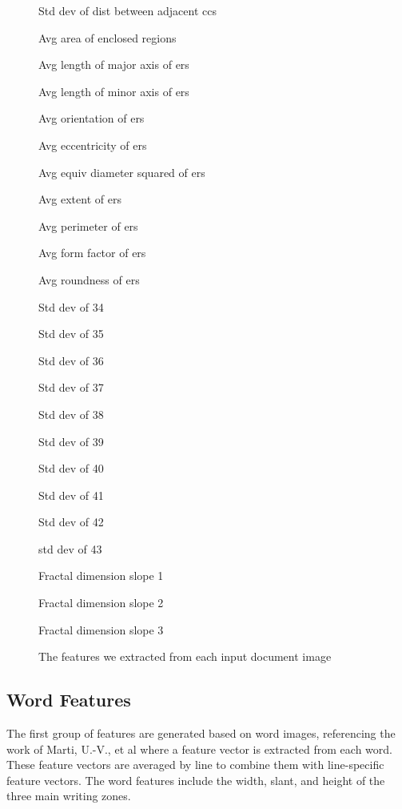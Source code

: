 \documentclass[paper=a4, fontsize=11pt]{scrartcl} %
\numberwithin{equation}{section} %
\numberwithin{figure}{section} %
\numberwithin{table}{section} %
\begin{document}
\begin{figure}
\begin{multicols}{3}
\begin{enumerate*}
    \item Std dev of dist between adjacent ccs
    \item Avg area of enclosed regions
    \item Avg length of major axis of ers
    \item Avg length of minor axis of ers
    \item Avg orientation of ers
    \item Avg eccentricity of ers
    \item Avg equiv diameter squared of ers
    \item Avg extent of ers
    \item Avg perimeter of ers
    \item Avg form factor of ers
    \item Avg roundness of ers
    \item Std dev of 34
    \item Std dev of 35
    \item Std dev of 36
    \item Std dev of 37
    \item Std dev of 38
    \item Std dev of 39
    \item Std dev of 40
    \item Std dev of 41
    \item Std dev of 42
    \item std dev of 43
    \item Fractal dimension slope 1
    \item Fractal dimension slope 2
    \item Fractal dimension slope 3
    \end{enumerate*}
  \end{multicols}
  \caption{The features we extracted from each input document image}
  \label{fig:featureList}
\end{figure}

\subsection{Word Features}
The first group of features are generated based on word images,
referencing the work of Marti, U.-V., et al \cite{WriterID} where a
feature vector is extracted from each word. These feature vectors are
averaged by line to combine them with line-specific feature
vectors. The word features include the width, slant, and height of the
three main writing zones.
\end{document}
